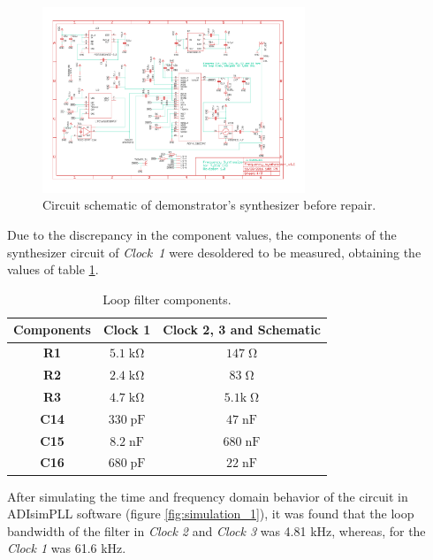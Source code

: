 \documentclass[a4paper,12pt]{article}
\begin{document}
\begin{figure}[!h]
    \centering
    \includegraphics[width=0.7\textwidth]{Images/Frequency_synthesizer_v1.0.sch.pdf}
    \captionsetup{justification=centering}
    \caption{Circuit schematic of demonstrator's synthesizer before repair.} 
    \label{fig:sch_synth}
\end{figure}

Due to the discrepancy in the component values, the components of the synthesizer circuit of \mbox{\textit{Clock 1}} were desoldered to be measured, obtaining the values of table \ref{table:components}.

\begin{table}[!h]
\centering
\begin{tabular}{|c|c|c|}
\hline
\textbf{Components}    & \textbf{Clock 1}           & \textbf{Clock 2, 3 and Schematic} \\ \hline
\textbf{R1}  & $5.1\; \mathrm{k\Omega}$ & $147\; \mathrm{\Omega}$        \\ \hline
\textbf{R2}  & $2.4\; \mathrm{k\Omega}$ & $83\; \mathrm{\Omega}$         \\ \hline
\textbf{R3}  & $4.7\; \mathrm{k\Omega}$ & $5.1 \mathrm{k\; \Omega}$      \\ \hline
\textbf{C14} & $330\; \mathrm{pF}$                     & $47\; \mathrm{nF}$                            \\ \hline
\textbf{C15} & $8.2\; \mathrm{nF}$                     & $680\; \mathrm{nF}$                           \\ \hline
\textbf{C16} & $680\; \mathrm{pF}$                     & $22\; \mathrm{nF}$                            \\ \hline
\end{tabular}
\caption{Loop filter components.}
\label{table:components}
\end{table}

After simulating the time and frequency domain behavior of the circuit in ADIsimPLL software (figure \ref{fig:simulation_1}), it was found that the loop bandwidth of the filter in \textit{Clock 2} and \textit{Clock 3} was 4.81 kHz, whereas, for the \textit{Clock 1} was 61.6 kHz. 
\end{document}
